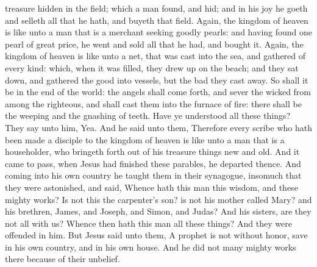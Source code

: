 treasure hidden in the field; which a man found, and hid; and in his joy he goeth and selleth all that he hath, and buyeth that field.  Again, the kingdom of heaven is like unto a man that is a merchant seeking goodly pearls: and having found one pearl of great price, he went and sold all that he had, and bought it.  Again, the kingdom of heaven is like unto a net, that was cast into the sea, and gathered of every kind: which, when it was filled, they drew up on the beach; and they sat down, and gathered the good into vessels, but the bad they cast away. So shall it be in the end of the world: the angels shall come forth, and sever the wicked from among the righteous, and shall cast them into the furnace of fire: there shall be the weeping and the gnashing of teeth.  Have ye understood all these things? They say unto him, Yea. And he said unto them, Therefore every scribe who hath been made a disciple to the kingdom of heaven is like unto a man that is a householder, who bringeth forth out of his treasure things new and old.  And it came to pass, when Jesus had finished these parables, he departed thence.  And coming into his own country he taught them in their synagogue, insomuch that they were astonished, and said, Whence hath this man this wisdom, and these mighty works? Is not this the carpenter’s son? is not his mother called Mary? and his brethren, James, and Joseph, and Simon, and Judas? And his sisters, are they not all with us? Whence then hath this man all these things? And they were offended in him. But Jesus said unto them, A prophet is not without honor, save in his own country, and in his own house. And he did not many mighty works there because of their unbelief. 

